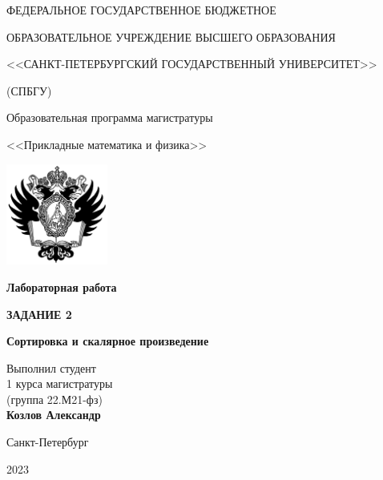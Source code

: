 \begin{titlepage}
	\begin{center}
	{\textsc{ФЕДЕРАЛЬНОЕ ГОСУДАРСТВЕННОЕ БЮДЖЕТНОЕ}}
	
	{\textsc{ОБРАЗОВАТЕЛЬНОЕ УЧРЕЖДЕНИЕ ВЫСШЕГО ОБРАЗОВАНИЯ}}
	
	{\textsc{<<САНКТ-ПЕТЕРБУРГСКИЙ ГОСУДАРСТВЕННЫЙ УНИВЕРСИТЕТ>>}}
	
	{\textsc{(СПБГУ)}}
	
	\vspace{1cm}
    {\large{Образовательная программа магистратуры}}
    
    {\large{<<Прикладные математика и физика>>}}
	\vspace{1cm}
	
	\includegraphics[width=0.25\textwidth]{fig/logo.png}
	
	\vspace{2cm}
	{\Large\textbf{Лабораторная работа}}
	
	\vspace{0.25cm}
	{\Large\textbf{ЗАДАНИЕ 2}}
 
    \vspace{0.25cm}
	{\Large\textbf{Сортировка и скалярное произведение}}

	\vspace{3cm}
	\begin{flushright}
	Выполнил студент\\
	1 курса магистратуры\\
	(группа 22.М21-фз)\\
	\textbf{Козлов Александр}
	\end{flushright}

	\end{center}

	\vfill

	\begin{center}
	{Санкт-Петербург}
	
	{2023}
	\end{center}
\end{titlepage}